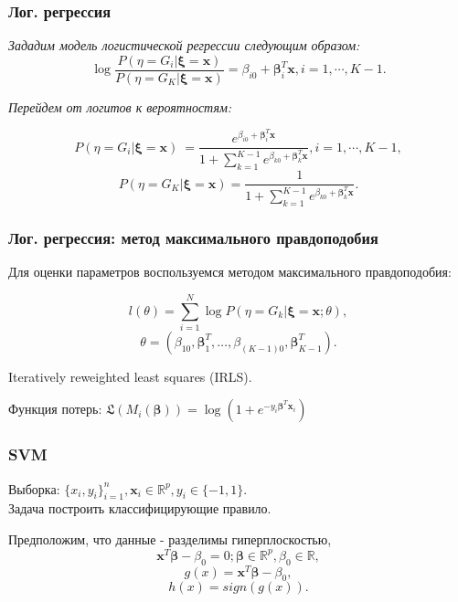 \documentclass[11pt]{beamer}
\begin{document}
	\begin{frame}
	\frametitle{Лог. регрессия}
			\textit{Зададим модель логистической регрессии следующим образом:}
			$$\log \dfrac{P(\eta = G_i | \bm{\xi} = \bm{x})}{P(\eta = G_K | \bm{\xi} = \bm{x})} = \beta_{i0} + \bm{\beta}_{i}^T \bm{x}, i = 1, \cdots, K-1.$$
			
			\textit{Перейдем от логитов к вероятностям:}
			
			$$P(\eta = G_i | \bm{\xi} = \bm{x})\ = \dfrac{e^{\beta_{i0} + \bm{\beta}_{i}^T \bm{x}} }{1 + \sum_{k = 1}^{K-1} e^{\beta_{k0} + \bm{\beta}_{k}^T \bm{x}}} , i = 1, \cdots, K-1 ,$$
			$$P(\eta = G_K | \bm{\xi} = \bm{x}) = \dfrac{1}{1 + \sum_{k = 1}^{K-1} e^{\beta_{k0} + \bm{\beta}_{k}^T \bm{x}}}.$$
		
	\end{frame}

	\begin{frame}
		\frametitle{Лог. регрессия: метод максимального правдоподобия}
		
		Для оценки параметров воспользуемся методом максимального правдоподобия:
		
			$$ l(\theta) = \sum\limits_{i=1}^{N} \log P(\eta = G_k | \bm{\xi} = \bm{x}; \theta ), $$
			$$ \theta = (\beta_{10}, \bm{\beta}^T_1, \dotsc, \beta_{(K-1)0}, \bm{\beta}^T_{K-1}). $$
		

		Iteratively reweighted least squares (IRLS).
		
		\bigskip 
		
		Функция потерь: $\mathfrak{L}(M_i(\bm{\beta})) = \log(1 + e^{-y_i \bm{\beta}^T \bm{x}_i})$
		
	\end{frame}


	\begin{frame}
		\frametitle{SVM}
	
		Выборка: $\{x_i, y_i\}_{i=1}^{n}, \bm{x}_i \in \mathbb{R}^{p}, y_i \in \{-1, 1\}$. \\
		Задача построить классифицирующие правило.\\
		
		\bigskip 
		
		Предположим, что данные - разделимы гиперплоскостью,
		$$ \bm{x}^T\bm{\beta} - \beta_0 = 0; \bm{\beta} \in  \mathbb{R}^{p}, \beta_0 \in \mathbb{R},$$
		$$ g(x) =  \bm{x}^T \bm{\beta} - \beta_0, $$
		$$ h(x) =  sign ( g(x) ).$$
	
	\end{frame}
\end{document}
